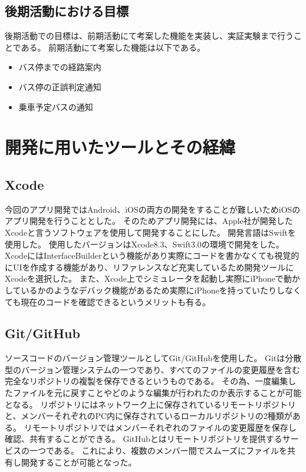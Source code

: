 \documentclass[openany,11pt,papersize]{jsbook}
\begin{document}

\subsection{後期活動における目標}
後期活動での目標は、前期活動にて考案した機能を実装し、実証実験まで行うことである。
前期活動にて考案した機能は以下である。
\begin{itemize}

\item バス停までの経路案内
\item バス停の正誤判定通知
\item 乗車予定バスの通知

\end{itemize}


\section{開発に用いたツールとその経緯}
\subsection{Xcode}
今回のアプリ開発ではAndroid、iOSの両方の開発をすることが難しいためiOSのアプリ開発を行うこととした。
そのためアプリ開発には、Apple社が開発したXcodeと言うソフトウェアを使用して開発することにした。
開発言語はSwiftを使用した。
使用したバージョンはXcode8.3、Swift3.0の環境で開発をした。
XcodeにはInterfaceBuilderという機能があり実際にコードを書かなくても視覚的にUIを作成する機能があり、リファレンスなど充実しているため開発ツールにXcodeを選択した。
また、Xcode上でシミュレータを起動し実際にiPhoneで動かしているかのようなデバック機能があるため実際にiPhoneを持っていたりしなくても現在のコードを確認できるというメリットも有る。


\subsection{Git/GitHub}
ソースコードのバージョン管理ツールとしてGit/GitHubを使用した。
Gitは分散型のバージョン管理システムの一つであり、すべてのファイルの変更履歴を含む完全なリポジトリの複製を保存できるというものである。
その為、一度編集したファイルを元に戻すことやどのような編集が行われたのか表示することが可能となる。
リポジトリにはネットワーク上に保存されているリモートリポジトリと、メンバーそれぞれのPC内に保存されているローカルリポジトリの2種類がある。
リモートリポジトリではメンバーそれぞれのファイルの変更履歴を保存し確認、共有することができる。
GitHubとはリモートリポジトリを提供するサービスの一つである。
これにより、複数のメンバー間でスムーズにファイルを共有し開発することが可能となった。
\end{document}
